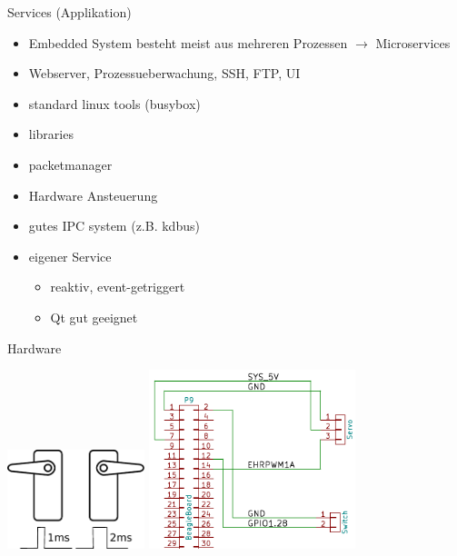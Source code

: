 \begin{frame}{Services (Applikation)}
	\begin{itemize}
		\item Embedded System besteht meist aus mehreren Prozessen $\rightarrow$ Microservices
		\item Webserver, Prozessueberwachung, SSH, FTP, UI
		\item standard linux tools (busybox)
		\item libraries
		\item packetmanager
		\item Hardware Ansteuerung
		\item gutes IPC system (z.B. kdbus)
		\item eigener Service
		\begin{itemize}
			\item reaktiv, event-getriggert
			\item Qt gut geeignet
		\end{itemize}
	\end{itemize}
\end{frame}

\begin{frame}{Hardware}
	\begin{center}
		\includegraphics[width=4cm]{res/servo_pwm.pdf}
		\includegraphics[width=6cm]{res/mume_schematic.pdf}
	\end{center}
\end{frame}

